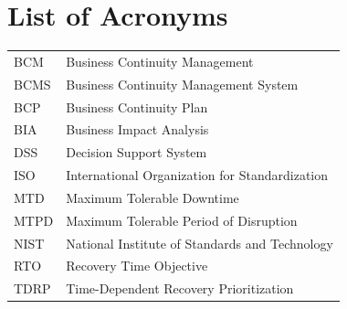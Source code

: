 \chapter*{List of Acronyms}

\begin{table}[ht!]
		\begin{tabular}{ll}
            BCM & Business Continuity Management\\
            BCMS & Business Continuity Management System\\
            BCP & Business Continuity Plan\\
            BIA & Business Impact Analysis\\
            DSS & Decision Support System\\
            ISO & International Organization for Standardization\\
            MTD & Maximum Tolerable Downtime\\
            MTPD & Maximum Tolerable Period of Disruption\\
            NIST & National Institute of Standards and Technology\\
            RTO & Recovery Time Objective\\
            TDRP & Time-Dependent Recovery Prioritization\\
  
		\end{tabular}
\end{table}